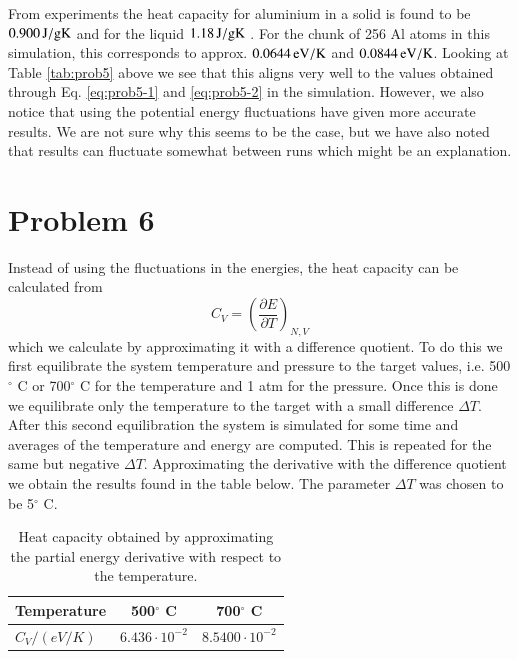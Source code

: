 From experiments the heat capacity for aluminium in a solid is found to be $\unit[0.900]{J/g K}$ \cite{al_heat_solid} and for the liquid $\unit[1.18]{J/g K}$ \cite{al_heat_liquid}. For the chunk of 256 Al atoms in this simulation, this corresponds to approx. $\unit[0.0644]{eV/K}$ and $\unit[0.0844]{eV/K}$. Looking at Table \ref{tab:prob5} above we see that this aligns very well to the values obtained through Eq. \eqref{eq:prob5-1} and \eqref{eq:prob5-2} in the simulation. However, we also notice that using the potential energy fluctuations have given more accurate results. We are not sure why this seems to be the case, but we have also noted that results can fluctuate somewhat between runs which might be an explanation.

\section*{Problem 6}

Instead of using the fluctuations in the energies, the heat capacity can be calculated from 
\begin{equation}
	C_V = \left( \frac{\partial E}{\partial T} \right)_{N,V}
\end{equation}
which we calculate by approximating it with a difference quotient. To do this we first equilibrate the system temperature and pressure to the target values, i.e. 500$^\circ$ C or 700$^\circ$ C for the temperature and 1 atm for the pressure. Once this is done we equilibrate only the temperature to the target with a small difference $\Delta T$. After this second equilibration the system is simulated for some time and averages of the temperature and energy are computed. This is repeated for the same but negative $\Delta T$. Approximating the derivative with the difference quotient we obtain the results found in the table below. The parameter $\Delta T$ was chosen to be 5$^\circ$ C.

\begin{table}[h!]
	\centering	
	\caption{Heat capacity obtained by approximating the partial energy derivative with respect to the temperature.}
	\begin{tabular}{l|cc}
		\hline \textbf{Temperature} & \textbf{500$^\circ$ C} & \textbf{700$^\circ$ C} \\ \hline
		$C_V / (\unit{eV/K})$ & $6.436 \cdot 10^{-2}$ & $8.5400 \cdot 10^{-2}$ \\ \hline
	\end{tabular}
	\label{tab:prob6}
\end{table}

